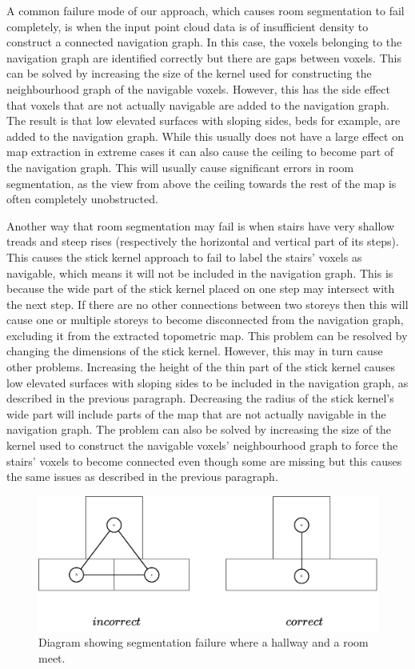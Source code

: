 A common failure mode of our approach, which causes room segmentation to fail completely, is when the input point cloud data is of insufficient density to construct a connected navigation graph. In this case, the voxels belonging to the navigation graph are identified correctly but there are gaps between voxels. This can be solved by increasing the size of the kernel used for constructing the neighbourhood graph of the navigable voxels. However, this has the side effect that voxels that are not actually navigable are added to the navigation graph. The result is that low elevated surfaces with sloping sides, beds for example, are added to the navigation graph. While this usually does not have a large effect on map extraction in extreme cases it can also cause the ceiling to become part of the navigation graph. This will usually cause significant errors in room segmentation, as the view from above the ceiling towards the rest of the map is often completely unobstructed.

Another way that room segmentation may fail is when stairs have very shallow treads and steep rises (respectively the horizontal and vertical part of its steps). This causes the stick kernel approach to fail to label the stairs' voxels as navigable, which means it will not be included in the navigation graph. This is because the wide part of the stick kernel placed on one step may intersect with the next step. If there are no other connections between two storeys then this will cause one or multiple storeys to become disconnected from the navigation graph, excluding it from the extracted topometric map. This problem can be resolved by changing the dimensions of the stick kernel. However, this may in turn cause other problems. Increasing the height of the thin part of the stick kernel causes low elevated surfaces with sloping sides to be included in the navigation graph, as described in the previous paragraph. Decreasing the radius of the stick kernel's wide part will include parts of the map that are not actually navigable in the navigation graph. The problem can also be solved by increasing the size of the kernel used to construct the navigable voxels' neighbourhood graph to force the stairs'  voxels to become connected even though some are missing but this causes the same issues as described in the previous paragraph.

\begin{figure}[h]
    \centering
    \includegraphics*[width=.8\textwidth]{./fig/segmentation_failure.drawio.pdf}
    \caption{Diagram showing segmentation failure where a hallway and a room meet.}
    \label{fig:seg_fail}
\end{figure}


